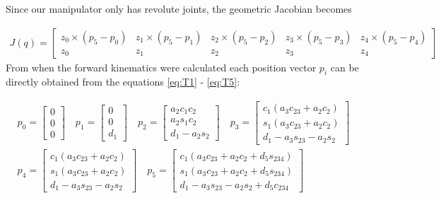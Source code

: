Since our manipulator only has revolute joints, the geometric Jacobian becomes

\begin{align*}
    J(q) = 
    \begin{bmatrix}
        z_0 \times (p_5-p_0) & 
        z_1 \times (p_5-p_1) & 
        z_2 \times (p_5-p_2) & 
        z_3 \times (p_5-p_3) & 
        z_4 \times (p_5-p_4) \\
        z_0 &
        z_1 &
        z_2 &
        z_3 &
        z_4
    \end{bmatrix}
\end{align*}
From when the forward kinematics were calculated each position vector $p_i$ can be directly obtained from the equations \eqref{eq:T1} - \eqref{eq:T5}:



\begin{align*}
    p_0 = \begin{bmatrix} 0 \\ 0 \\ 0 \end{bmatrix}    \quad
    p_1 = \begin{bmatrix} 0 \\ 0 \\ d_1\end{bmatrix}    \quad
    p_2 = \begin{bmatrix} a_2c_1c_2\\ a_2s_1c_2\\ d_1 - a_2s_2\end{bmatrix}   \quad 
    p_3 = \begin{bmatrix} c_1(a_3c_{23} + a_2c_2) \\ s_1(a_3c_{23} + a_2c_2) \\ d_1 - a_3s_{23}-a_2s_2 \end{bmatrix}  \\  
    p_4 = \begin{bmatrix} c_1(a_3c_{23} + a_2c_2) \\ s_1(a_3c_{23} + a_2c_2) \\ d_1 - a_3s_{23}-a_2s_2\end{bmatrix}  \quad  
    p_5 = \begin{bmatrix} c_1(a_3c_{23} + a_2c_2 + d_5s_{234}) \\ s_1(a_3c_{23} + a_2c_2 + d_5s_{234}) \\ d_1 - a_3s_{23} - a_2s_2 + d_5c_{234} \end{bmatrix}    
\end{align*}


